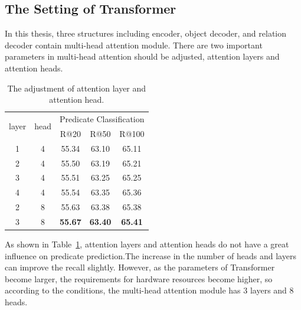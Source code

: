 \subsection{The Setting of Transformer }%
In this thesis, three structures including encoder, object decoder, and relation decoder  contain multi-head attention module. There are two important parameters in multi-head attention should be adjusted, attention layers and attention heads.

\begin{table}[H]
	\centering
	\begin{tabular}{cc|ccc}
		\hline
		\multirow{2}{*}{layer} & \multirow{2}{*}{head} & \multicolumn{3}{c}{Predicate Classification} \\ \cline{3-5} 
		&                       & R@20          & R@50          & R@100         \\ \hline
		1                      & 4                     & 55.34         & 63.10         & 65.11         \\
		2                      & 4                     & 55.50         & 63.19         & 65.21         \\
		3                      & 4                     & 55.51         & 63.25         & 65.25         \\
		4                      & 4                     & 55.54         & 63.35         & 65.36         \\
		2                      & 8                     & 55.63         & 63.38         & 65.38         \\
		3                      & 8                     & \textbf{55.67 }        & \textbf{63.40}         & \textbf{65.41}        \\ \hline
	\end{tabular}
\caption[The Setting of Transformer]{The adjustment of attention layer and attention head.} %
\label{tab:transfomerset}
\end{table}

As shown in Table~\ref{tab:transfomerset}, attention layers and attention heads do not have a great influence on predicate prediction.The increase in the number of heads and layers can improve the recall slightly. However, as the parameters of Transformer become larger, the requirements for hardware resources become higher, so according to the conditions,  the multi-head attention module has 3 layers and 8 heads.


